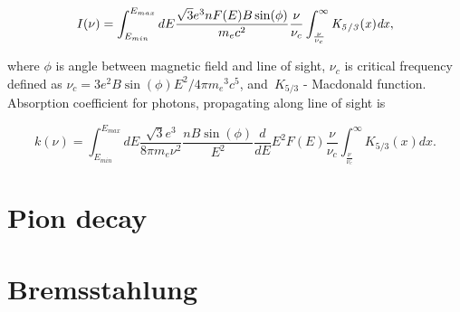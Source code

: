 \begin{equation} \label{emission}
	I(\nu)=\int_{E_{min}}^{E_{max}} dE \frac {\sqrt {3}{e}^{3}n F(E) B \sin ( \phi)}{{m_e}{c}^{2}}
	\frac{\nu}{\nu_c}\int_{\frac {\nu}{\nu_c}}^{\infty }\it K_{5/3}(x)dx,
\end{equation}

where $\phi$ is angle between magnetic field and line of sight, $\displaystyle\nu_{c}$ is critical frequency defined as $\displaystyle\nu_{c} = 3 e^{2} B \sin(\phi) E^{2}/4\pi {m_{e}}^{3} c^{5}$, and~$K_{5/3}$ - Macdonald function.
Absorption coefficient for photons, propagating along line of sight is

\begin{equation}\label{absorption}
	k(\nu)=\int_{E_{min}}^{E_{max}}dE\frac {\sqrt {3}{e}^{3}}{8\pi m_e \nu^2}\frac{n B\sin(\phi)}{E^2}
	\frac{d}{dE} E^2 F(E)\frac {\nu}{ \nu_c}\int_{\frac {\nu}{ \nu_c}}^{\infty }K_{5/3}(x) dx.
\end{equation}

\section{Pion decay}

\section{Bremsstahlung}